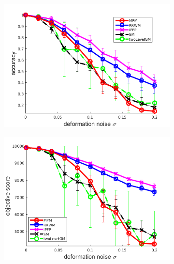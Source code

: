 \begin{figure}[h]
	\begin{subfigure}[b]{0.33\textwidth}
		\centering
		\includegraphics[scale=0.25]{"chapter3/fig/SyntheticTest/descr/Results_v4.3.3/Test2/accuracy_avg10t"} 
	\end{subfigure}
	\begin{subfigure}[b]{0.33\textwidth}
		\centering
		\includegraphics[scale=0.25]{"chapter3/fig/SyntheticTest/descr/Results_v4.3.3/Test2/score_avg10t"} 
	\end{subfigure} 
	\begin{subfigure}[b]{0.31\textwidth}
		\centering

\end{subfigure}
\end{figure}
